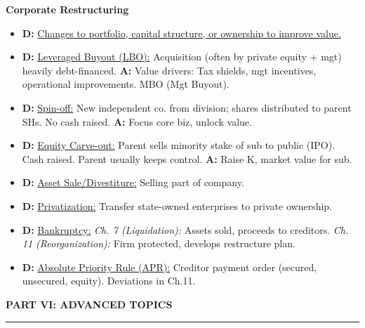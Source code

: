 \documentclass[7pt,landscape]{extarticle} %
\newcommand{\cheatsheetsection}[1]{%
  \vspace{0.25ex plus 0.1ex minus 0.05ex}%
  \noindent\color{SecTitleColor}\textbf{\sffamily\small\MakeUppercase{#1}}%
  \par\vspace{0.02ex}%
  {\color{RuleColor}\hrule height 0.3pt}\par\vspace{0.15ex}%
}
\newcommand{\cheatsheetsubsubsection}[1]{%
  \vspace{0.15ex plus 0.05ex minus 0.05ex}%
  \noindent\textbf{\sffamily\scriptsize #1}%
  \par\vspace{0.05ex}%
}
\newcommand{\D}[1]{\textbf{\textcolor{DefColor}{D:}} \uline{#1}}
\newcommand{\A}[1]{\textbf{\textcolor{AppColor}{A:}} #1}
\begin{document}
\begin{multicols*}{4}
  \cheatsheetsubsubsection{Corporate Restructuring}
  \begin{itemize}
    \item \D{Changes to portfolio, capital structure, or ownership to improve value.}
    \item \D{Leveraged Buyout (LBO):} Acquisition (often by private equity + mgt) heavily debt-financed. \A{Value drivers: Tax shields, mgt incentives, operational improvements.} MBO (Mgt Buyout).
    \item \D{Spin-off:} New independent co. from division; shares distributed to parent SHs. No cash raised. \A{Focus core biz, unlock value.}
    \item \D{Equity Carve-out:} Parent sells minority stake of sub to public (IPO). Cash raised. Parent usually keeps control. \A{Raise K, market value for sub.}
    \item \D{Asset Sale/Divestiture:} Selling part of company.
    \item \D{Privatization:} Transfer state-owned enterprises to private ownership.
    \item \D{Bankruptcy:} \emph{Ch. 7 (Liquidation):} Assets sold, proceeds to creditors. \emph{Ch. 11 (Reorganization):} Firm protected, develops restructure plan.
    \item \D{Absolute Priority Rule (APR):} Creditor payment order (secured, unsecured, equity). Deviations in Ch.11.
  \end{itemize}

  \cheatsheetsection{Part VI: Advanced Topics}
  

\end{multicols*}
\end{document}
